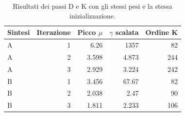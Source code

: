 \begin{table}[htbp]\centering\small
\setlength{\tabcolsep}{4pt}
\begin{tabular}{lrrrr}\toprule
Sintesi & Iterazione & Picco $\mu$ & $\gamma$ scalata & Ordine K\\\midrule
A & 1 & \num{6.26} & \num{1357} & 82\\
A & 2 & \num{3.598} & \num{4.873} & 244\\
A & 3 & \num{2.929} & \num{3.224} & 242\\
B & 1 & \num{3.456} & \num{67.67} & 82\\
B & 2 & \num{2.038} & \num{2.47} & 90\\
B & 3 & \num{1.811} & \num{2.233} & 106\\
\bottomrule\end{tabular}
\caption{Risultati dei passi D e K con gli stessi pesi e la stessa inizializzazione.}
\label{tab:cap9-dk}
\end{table}
